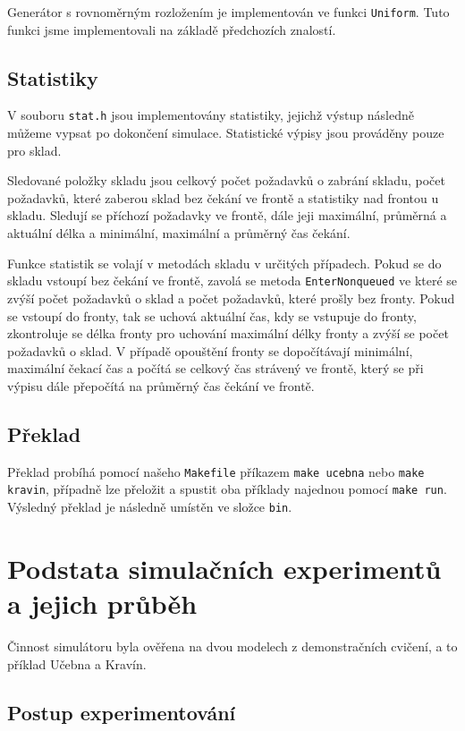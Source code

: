 \documentclass[12pt,a4paper,titlepage,final]{article}
\begin{document}
Generátor s rovnoměrným rozložením je implementován ve funkci \texttt{Uniform}. Tuto funkci jsme implementovali na základě předchozích znalostí.

\subsection{Statistiky}

V souboru \texttt{stat.h} jsou implementovány statistiky, jejichž výstup následně můžeme vypsat po dokončení simulace. Statistické výpisy jsou prováděny pouze pro sklad. 

Sledované položky skladu jsou celkový počet požadavků o zabrání skladu, počet požadavků, které zaberou sklad bez čekání ve frontě a statistiky nad frontou u skladu. Sledují se příchozí požadavky ve frontě, dále jeji maximální, průměrná a aktuální délka a minimální, maximální a průměrný čas čekání. 

Funkce statistik se volají v metodách skladu v určitých případech. Pokud se do skladu vstoupí bez čekání ve frontě, zavolá se metoda \texttt{EnterNonqueued} ve které se zvýší počet požadavků o sklad a počet požadavků, které prošly bez fronty. Pokud se vstoupí do fronty, tak se uchová aktuální čas, kdy se vstupuje do fronty, zkontroluje se délka fronty pro uchování maximální délky fronty a zvýší se počet požadavků o sklad. V případě opouštění fronty se dopočítávají minimální, maximální čekací čas a počítá se celkový čas strávený ve frontě, který se při výpisu dále přepočítá na průměrný čas čekání ve frontě.

\subsection{Překlad}

Překlad probíhá pomocí našeho \texttt{Makefile} příkazem \texttt{make ucebna} nebo \texttt{make kravin}, případně lze přeložit a spustit oba příklady najednou pomocí \texttt{make run}. Výsledný překlad je následně umístěn ve složce \texttt{bin}.

\section{Podstata simulačních experimentů a jejich průběh}

Činnost simulátoru byla ověřena na dvou modelech z demonstračních cvičení, a to příklad Učebna a Kravín.

\subsection{Postup experimentování} 
\end{document}
